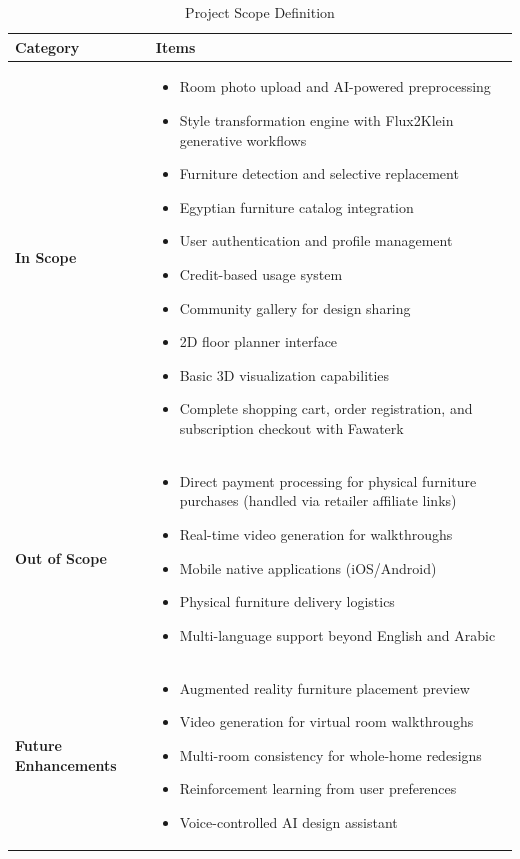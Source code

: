\begin{table}[htbp]
    \centering
    \caption{Project Scope Definition}
    \label{tab:scope}
    \begin{tabularx}{\textwidth}{|l|X|}
        \hline
        \textbf{Category} & \textbf{Items} \\
        \hline
        \textbf{In Scope} & 
        \begin{itemize}[nosep,leftmargin=*]
            \item Room photo upload and AI-powered preprocessing
            \item Style transformation engine with Flux2Klein generative workflows
            \item Furniture detection and selective replacement
            \item Egyptian furniture catalog integration
            \item User authentication and profile management
            \item Credit-based usage system
            \item Community gallery for design sharing
            \item 2D floor planner interface
            \item Basic 3D visualization capabilities
            \item Complete shopping cart, order registration, and subscription checkout with Fawaterk
        \end{itemize} \\
        \hline
        \textbf{Out of Scope} & 
        \begin{itemize}[nosep,leftmargin=*]
            \item Direct payment processing for physical furniture purchases (handled via retailer affiliate links)
            \item Real-time video generation for walkthroughs
            \item Mobile native applications (iOS/Android)
            \item Physical furniture delivery logistics
            \item Multi-language support beyond English and Arabic
        \end{itemize} \\
        \hline
        \textbf{Future Enhancements} & 
        \begin{itemize}[nosep,leftmargin=*]
            \item Augmented reality furniture placement preview
            \item Video generation for virtual room walkthroughs
            \item Multi-room consistency for whole-home redesigns
            \item Reinforcement learning from user preferences
            \item Voice-controlled AI design assistant
        \end{itemize} \\
        \hline
    \end{tabularx}
\end{table}

